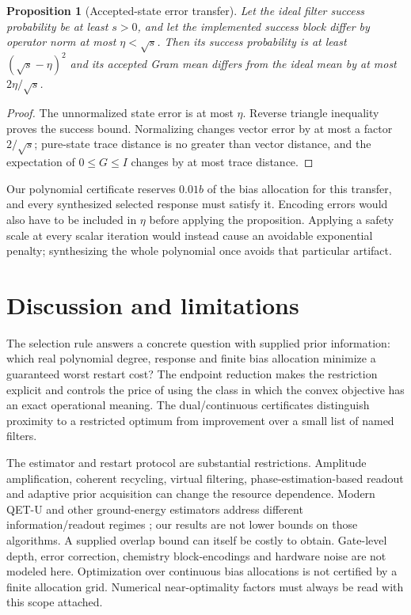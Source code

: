 \documentclass[11pt]{article}
\newtheorem{proposition}[theorem]{Proposition}
\begin{document}
\begin{proposition}[Accepted-state error transfer]\label{prop:phase}
Let the ideal filter success probability be at least $s>0$, and let
the implemented success block differ by operator norm at most $\eta<\sqrt s$.
Then its success probability is at least $(\sqrt s-\eta)^2$ and its
accepted Gram mean differs from the ideal mean by at most
$2\eta/\sqrt s$.
\end{proposition}
\begin{proof}
The unnormalized state error is at most $\eta$. Reverse triangle
inequality proves the success bound. Normalizing changes vector error
by at most a factor $2/\sqrt s$; pure-state trace distance is no greater
than vector distance, and the expectation of $0\leq G\leq I$ changes
by at most trace distance.
\end{proof}
Our polynomial certificate reserves $0.01b$ of the bias allocation for
this transfer, and every synthesized selected response must satisfy it.
Encoding errors would also have to be included in $\eta$ before applying
the proposition. Applying a safety scale at every scalar iteration would
instead cause an avoidable exponential penalty; synthesizing the whole
polynomial once avoids that particular artifact.





\section{Discussion and limitations}
The selection rule answers a concrete question with supplied prior
information: which real polynomial degree, response and finite bias
allocation minimize a guaranteed worst restart cost? The endpoint
reduction makes the restriction explicit and controls the price of using
the class in which the convex objective has an exact operational meaning.
The dual/continuous certificates distinguish proximity to a restricted
optimum from improvement over a small list of named filters.

The estimator and restart protocol are substantial restrictions.
Amplitude amplification, coherent recycling, virtual filtering,
phase-estimation-based readout and adaptive prior acquisition can change
the resource dependence. Modern QET-U and other ground-energy estimators
address different information/readout regimes \cite{QETU,Accurate}; our
results are not lower bounds on those algorithms. A supplied overlap
bound can itself be costly to obtain. Gate-level depth, error correction,
chemistry block-encodings and hardware noise are not modeled here.
Optimization over continuous bias allocations is not certified by a
finite allocation grid. Numerical near-optimality factors must always be
read with this scope attached.
\end{document}
